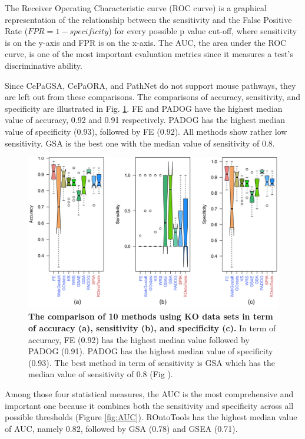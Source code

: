 \documentclass[Minh_PhD_thesis.tex]{subfiles}
\begin{document}
The Receiver Operating Characteristic curve (ROC curve) is a graphical representation of the relationship between the sensitivity and the False Positive Rate ($FPR = 1-specificity$) for every possible p value cut-off, where sensitivity is on the y-axis and FPR is on the x-axis. The AUC, the area under the ROC curve, is one of the most important evaluation metrics since it measures a test's discriminative ability.
 

Since CePaGSA, CePaORA, and PathNet do not support mouse pathways, they are left out from these comparisons. 
The comparisons of accuracy, sensitivity, and specificity are illustrated in Fig. \ref{fig:AccSenSpe}.
FE and PADOG have the highest median value of accuracy, 0.92 and 0.91 respectively. PADOG has the highest median value of specificity (0.93), followed by FE (0.92). 
All methods show rather low sensitivity. 
GSA is the best one with the median value of sensitivity of 0.8. 

\begin{figure}
\centering
  \captionsetup{width=0.7\linewidth}

	\includegraphics[width=1\linewidth]{../Figures/Acc_Sens_Spec_v3}
	\caption{\textbf{The comparison of 10 methods using KO data sets in term of accuracy (a), sensitivity (b), and specificity (c).} In term of accuracy, FE (0.92) has the highest median value followed by PADOG (0.91). PADOG has the highest median value of specificity (0.93). The best method in term of sensitivity is GSA which has the median value of sensitivity of 0.8 (Fig \label{fig:AccSenSpe}).}
\end{figure}


Among those four statistical measures, the AUC is the most comprehensive and important one because it combines both the sensitivity and specificity across all possible thresholds (Figure \ref{fig:AUC}).
ROntoTools has the highest median value of AUC, namely 0.82, followed by GSA (0.78) and GSEA (0.71).
\end{document}
